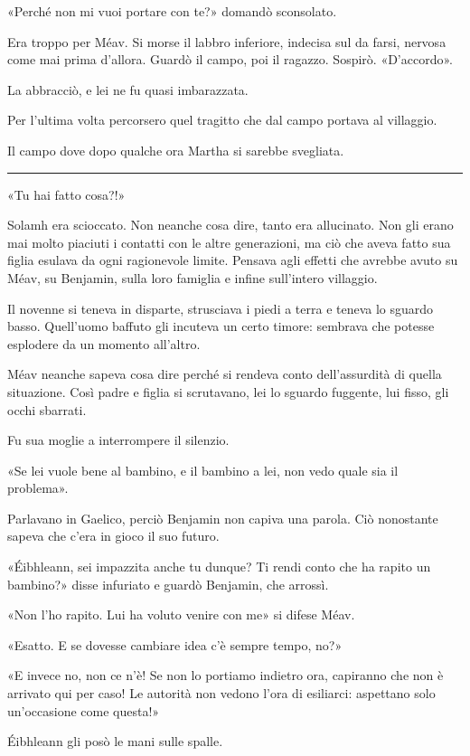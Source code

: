 «Perché non mi vuoi portare con te?» domandò sconsolato.

Era troppo per Méav. Si morse il labbro inferiore, indecisa sul da farsi, nervosa come mai prima
d'allora. Guardò il campo, poi il ragazzo. Sospirò. «D'accordo».

La abbracciò, e lei ne fu quasi imbarazzata.

Per l'ultima volta percorsero quel tragitto che dal campo portava al villaggio.

Il campo dove dopo qualche ora Martha si sarebbe svegliata.

\plainbreak{1}

«Tu hai fatto cosa?!»

Solamh era scioccato. Non neanche cosa dire, tanto era allucinato. Non gli erano mai molto piaciuti
i contatti con le altre generazioni, ma ciò che aveva fatto sua figlia esulava da ogni ragionevole
limite. Pensava agli effetti che avrebbe avuto su Méav, su Benjamin, sulla loro famiglia e infine
sull'intero villaggio.

Il novenne si teneva in disparte, strusciava i piedi a terra e teneva lo sguardo basso. Quell'uomo
baffuto gli incuteva un certo timore: sembrava che potesse esplodere da un momento all'altro.

Méav neanche sapeva cosa dire perché si rendeva conto dell'assurdità di quella situazione. Così
padre e figlia si scrutavano, lei lo sguardo fuggente, lui fisso, gli occhi sbarrati.

Fu sua moglie a interrompere il silenzio.

«Se lei vuole bene al bambino, e il bambino a lei, non vedo quale sia il problema».

Parlavano in Gaelico, perciò Benjamin non capiva una parola. Ciò nonostante sapeva che c'era in
gioco il suo futuro.

«Éibhleann, sei impazzita anche tu dunque? Ti rendi conto che ha rapito un bambino?» disse infuriato
e guardò Benjamin, che arrossì.

«Non l'ho rapito. Lui ha voluto venire con me» si difese Méav.

«Esatto. E se dovesse cambiare idea c'è sempre tempo, no?»

«E invece no, non ce n'è! Se non lo portiamo indietro ora, capiranno che non è arrivato qui per
caso! Le autorità non vedono l'ora di esiliarci: aspettano solo un'occasione come questa!»

Éibhleann gli posò le mani sulle spalle.

